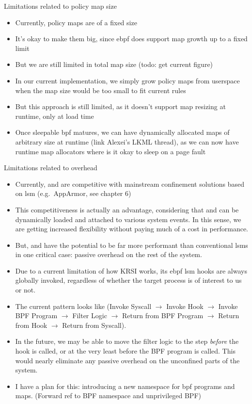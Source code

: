 \begin{inprogress}
  Limitations related to policy map size
  \begin{itemize}
    \item Currently, policy maps are of a fixed size
    \item It's okay to make them big, since \gls{ebpf} does support map growth up to a fixed limit
    \item But we are still limited in total map size (todo: get current figure)
    \item In our current implementation, we simply grow policy maps from userspace when the map size would be too small to fit current rules
    \item But this approach is still limited, as it doesn't support map resizing at runtime, only at load time
    \item Once sleepable \gls{bpf} matures, we can have dynamically allocated maps of
    arbitrary size at runtime (link Alexei's LKML thread), as we can now have runtime map
    allocators where is it okay to sleep on a page fault
  \end{itemize}

  Limitations related to overhead
  \begin{itemize}
    \item Currently, \bpfbox{} and \bpfcontain{} are competitive with mainstream
    confinement solutions based on \gls{lsm} (e.g.~AppArmor, see chapter 6)
    \item This competitiveness is actually an advantage, considering that \bpfbox{} and
    \bpfcontain{} can be dynamically loaded and attached to various system events. In this sense,
    we are getting increased flexibility without paying much of a cost in performance.
    \item But, \bpfbox{} and \bpfcontain{} have the potential to be far more performant than
    conventional \gls{lsm}s in one critical case: passive overhead on the rest of the system.
    \item Due to a current limitation of how KRSI works, its \gls{ebpf} \gls{lsm} hooks are
    always globally invoked, regardless of whether the target process is of interest to us or not.
    \item The current pattern looks like (Invoke Syscall $\rightarrow$ Invoke Hook
    $\rightarrow$ Invoke BPF Program $\rightarrow$ Filter Logic $\rightarrow$ Return from
    BPF Program $\rightarrow$ Return from Hook $\rightarrow$ Return from Syscall).
    \item In the future, we may be able to move the filter logic to the step
    \textit{before}  the hook is called, or at the very least before the BPF program is
    called. This would nearly eliminate any passive overhead on the unconfined parts of the system.
    \item I have a plan for this: introducing a new namespace for \gls{bpf} programs and
    maps. (Forward ref to BPF namespace and unprivileged BPF)
  \end{itemize}


\end{inprogress}

